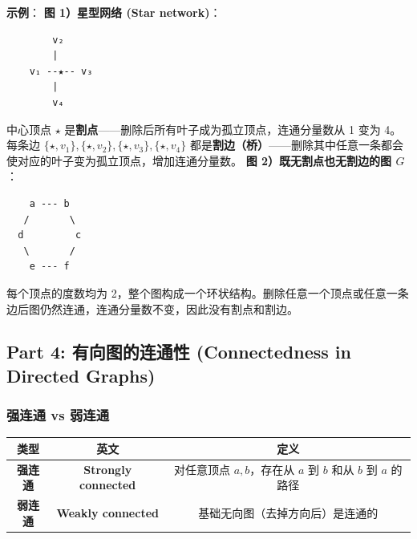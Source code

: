 \documentclass[10pt,a4paper,openany]{ctexbook}
\theoremstyle{definition}
\theoremstyle{remark}
\begin{document}
\textbf{示例}：
\textbf{图 1）星型网络 (Star network)}：
{\footnotesize\begin{verbatim}
        v₂
        |
    v₁ --★-- v₃
        |
        v₄
\end{verbatim}}

中心顶点 $\star$ 是\textbf{割点}——删除后所有叶子成为孤立顶点，连通分量数从 1 变为 4。每条边 $\{\star, v_1\}, \{\star, v_2\}, \{\star, v_3\}, \{\star, v_4\}$ 都是\textbf{割边（桥）}——删除其中任意一条都会使对应的叶子变为孤立顶点，增加连通分量数。
\textbf{图 2）既无割点也无割边的图 $G$}：
{\footnotesize\begin{verbatim}
    a --- b
   /       \
  d         c
   \       /
    e --- f
\end{verbatim}}

每个顶点的度数均为 2，整个图构成一个环状结构。删除任意一个顶点或任意一条边后图仍然连通，连通分量数不变，因此没有割点和割边。
\vspace{-2pt}

\subsection{Part 4: 有向图的连通性 (Connectedness in Directed Graphs)}

\subsubsection{强连通 vs 弱连通}

\begin{center}
\begin{tabular}{ccc}
\hline
类型 & 英文 & 定义 \\ \hline
\textbf{强连通} & \textbf{Strongly connected} & 对任意顶点 $a, b$，存在从 $a$ 到 $b$ 和从 $b$ 到 $a$ 的路径 \\
\textbf{弱连通} & \textbf{Weakly connected} & 基础无向图（去掉方向后）是连通的 \\
\hline
\end{tabular}

\end{center}
\end{document}
